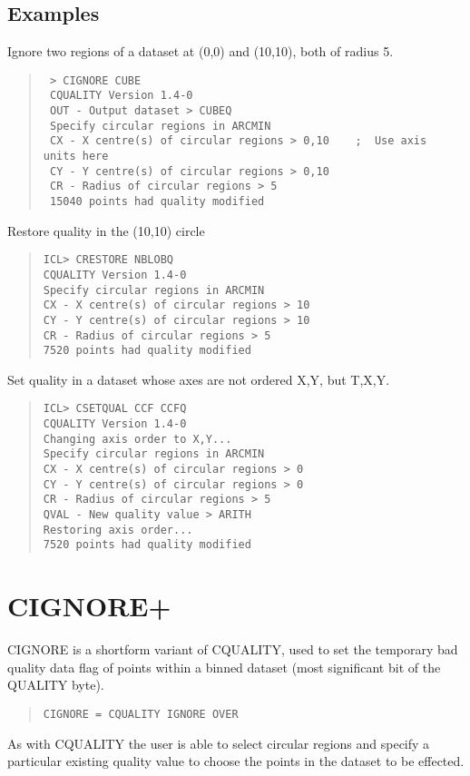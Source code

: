 \documentclass{book}
\renewcommand{\_}{{\tt\char'137}}     %
\begin{document}
\subsection{Examples}
Ignore two regions of a dataset at (0,0) and (10,10), both of radius 5.
\begin{quote}\begin{verbatim}
 > CIGNORE CUBE
 CQUALITY Version 1.4-0
 OUT - Output dataset > CUBEQ
 Specify circular regions in ARCMIN
 CX - X centre(s) of circular regions > 0,10    ;  Use axis units here
 CY - Y centre(s) of circular regions > 0,10
 CR - Radius of circular regions > 5
 15040 points had quality modified
\end{verbatim}\end{quote}
Restore quality in the (10,10) circle
\begin{quote}\begin{verbatim}
ICL> CRESTORE NBLOBQ
CQUALITY Version 1.4-0
Specify circular regions in ARCMIN
CX - X centre(s) of circular regions > 10
CY - Y centre(s) of circular regions > 10
CR - Radius of circular regions > 5
7520 points had quality modified
\end{verbatim}\end{quote}
Set quality in a dataset whose axes are not ordered X,Y, but T,X,Y.
\begin{quote}\begin{verbatim}
ICL> CSETQUAL CCF CCFQ
CQUALITY Version 1.4-0
Changing axis order to X,Y...
Specify circular regions in ARCMIN
CX - X centre(s) of circular regions > 0
CY - Y centre(s) of circular regions > 0
CR - Radius of circular regions > 5
QVAL - New quality value > ARITH
Restoring axis order...
7520 points had quality modified
\end{verbatim}\end{quote}
\section{CIGNORE+}
CIGNORE is a shortform variant of CQUALITY, used to set the
temporary bad quality data flag of points within a binned
dataset (most significant bit of the QUALITY byte).

\begin{quote}\begin{verbatim}
CIGNORE = CQUALITY IGNORE OVER
\end{verbatim}\end{quote}
As with CQUALITY the user is able to select circular regions and
specify a particular existing quality value to choose the points
in the dataset to be effected.
\end{document}
